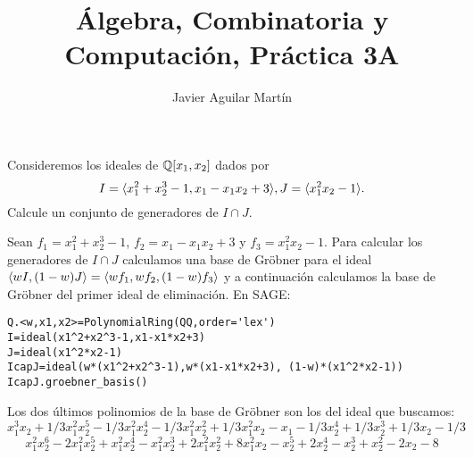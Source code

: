 \documentclass[twoside]{article}
\begin{document}
\title{Álgebra, Combinatoria y Computación, Práctica 3A}
\author{Javier Aguilar Martín}
\maketitle

\begin{ejercicio}{1}
Consideremos los ideales de $\mathbb{Q}[x_1,x_2]$ dados por 
\[
I=\langle{x_1^2+x_2^3-1, x_1-x_1x_2+3}\rangle,J=\langle{x_1^2x_2-1}\rangle.
\]
Calcule un conjunto de generadores de $I\cap J$.
\end{ejercicio}

\begin{solucion}
Sean $f_1=x_1^2+x_2^3-1$, $f_2=x_1-x_1x_2+3$ y $f_3=x_1^2x_2-1$. Para calcular los generadores de $I\cap J$ calculamos una base de Gröbner para el ideal $\langle{wI,(1-w)J}\rangle=\langle{wf_1,wf_2,(1-w)f_3}\rangle$ y a continuación calculamos la base de Gröbner del primer ideal de eliminación. En SAGE:
\begin{verbatim}
Q.<w,x1,x2>=PolynomialRing(QQ,order='lex')
I=ideal(x1^2+x2^3-1,x1-x1*x2+3)
J=ideal(x1^2*x2-1)
IcapJ=ideal(w*(x1^2+x2^3-1),w*(x1-x1*x2+3), (1-w)*(x1^2*x2-1))
IcapJ.groebner_basis()
\end{verbatim}
Los dos últimos polinomios de la base de Gröbner son los del ideal que buscamos:
\[
x_1^3x_2 + 1/3x_1^2x_2^5 - 1/3x_1^2x_2^4 - 1/3x_1^2x_2^2 + 1/3x_1^2x_2 - x_1 - 1/3x_2^4 + 1/3x_2^3 + 1/3x_2 - 1/3
\]
\[
x_1^2x_2^6 - 2x_1^2x_2^5 + x_1^2x_2^4 - x_1^2x_2^3 + 2x_1^2x_2^2 + 8x_1^2x_2 - x_2^5 + 2x_2^4 - x_2^3 + x_2^2 - 2x_2 - 8
\]

\end{solucion}
\end{document}
